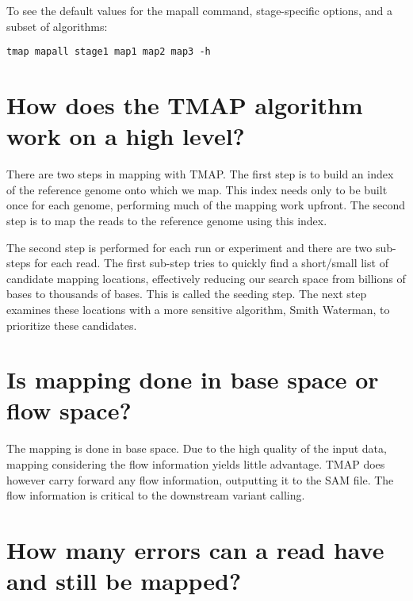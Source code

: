 \documentclass[a4paper,12pt]{book}
\begin{document}
To see the default values for the mapall command, stage-specific options, and a subset of algorithms:
\begin{verbatim}
tmap mapall stage1 map1 map2 map3 -h
\end{verbatim}

\section{How does the TMAP algorithm work on a high level?}

There are two steps in mapping with TMAP.
The first step is to build an index of the reference genome onto which we map.
This index needs only to be built once for each genome, performing much of the mapping work upfront.
The second step is to map the reads to the reference genome using this index.
	
The second step is performed for each run or experiment and there are two sub-steps for each read. 
The first sub-step tries to quickly find a short/small list of candidate mapping locations, effectively reducing our search space from billions of bases to thousands of bases.  
This is called the seeding step.  
The next step examines these locations with a more sensitive algorithm, Smith Waterman, to prioritize these candidates.

\section{Is mapping done in base space or flow space?}

The mapping is done in base space.  
Due to the high quality of the input data, mapping considering the flow information yields little advantage.  
TMAP does however carry forward any flow information, outputting it to the SAM file.  The flow information is critical to the downstream variant calling.

\section{How many errors can a read have and still be mapped?}
\label{sec:numerr}
\end{document}
